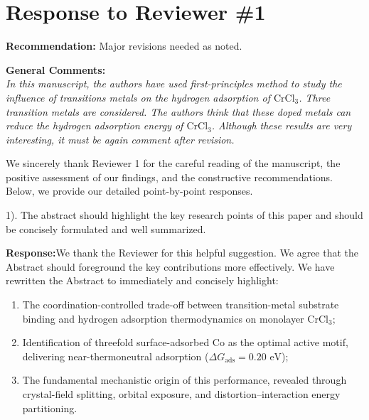 \documentclass[11pt, sans, a4paper]{moderncv}
\newcommand{\response}{\vspace{0.4em}\noindent\textbf{\color{actionblue}Response:}\hspace{0.5em}}
\begin{document}
\newpage

\section{Response to Reviewer \#1}

\noindent\textbf{Recommendation:} Major revisions needed as noted.

\vspace{0.5em}
\noindent\textbf{General Comments:}\\
\textit{In this manuscript, the authors have used first-principles method to study the influence of transitions metals on the hydrogen adsorption of $\text{CrCl}_3$. Three transition metals are considered. The authors think that these doped metals can reduce the hydrogen adsorption energy of $\text{CrCl}_3$. Although these results are very interesting, it must be again comment after revision.}

\vspace{0.5em}
\noindent We sincerely thank Reviewer 1 for the careful reading of the manuscript, the positive assessment of our findings, and the constructive recommendations. Below, we provide our detailed point-by-point responses.

\vspace{1em}

\begin{reviewercomment}
1). The abstract should highlight the key research points of this paper and should be concisely formulated and well summarized.
\end{reviewercomment}

\response We thank the Reviewer for this helpful suggestion. We agree that the Abstract should foreground the key contributions more effectively. We have rewritten the Abstract to immediately and concisely highlight:
\begin{enumerate}[leftmargin=1.5em, itemsep=0.2em]
\item The coordination-controlled trade-off between transition-metal substrate binding and hydrogen adsorption thermodynamics on monolayer $\text{CrCl}_3$;
\item Identification of threefold surface-adsorbed Co as the optimal active motif, delivering near-thermoneutral adsorption ($\Delta G_{\mathrm{ads}} = 0.20\text{ eV}$);
\item The fundamental mechanistic origin of this performance, revealed through crystal-field splitting, orbital exposure, and distortion--interaction energy partitioning.
\end{enumerate}
\end{document}
